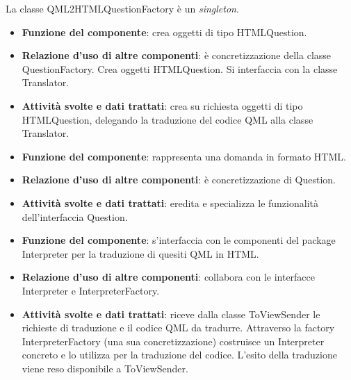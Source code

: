 \documentclass[a4paper,11pt]{article}
\begin{document}
			La classe QML2HTMLQuestionFactory è un \emph{singleton}.
			\begin{itemize}
				\item\textbf{Funzione del componente}: crea oggetti di tipo HTMLQuestion.
				\item\textbf{Relazione d'uso di altre componenti}: è concretizzazione della classe QuestionFactory. Crea oggetti HTMLQuestion. Si interfaccia con la classe Translator.
				\item\textbf{Attività svolte e dati trattati}: crea su richiesta oggetti di tipo HTMLQuestion, delegando la traduzione del codice QML alla classe Translator.
			\end{itemize}
			
			\begin{itemize}
				\item\textbf{Funzione del componente}: rappresenta una domanda in formato HTML.
				\item\textbf{Relazione d'uso di altre componenti}: è concretizzazione di Question.
				\item\textbf{Attività svolte e dati trattati}: eredita e specializza le funzionalità dell'interfaccia Question.
			\end{itemize}
			
			\begin{itemize}
				\item\textbf{Funzione del componente}: s'interfaccia con le componenti del package Interpreter per la traduzione di quesiti QML in HTML.
				\item\textbf{Relazione d'uso di altre componenti}: collabora con le interfacce Interpreter e InterpreterFactory.
				\item\textbf{Attività svolte e dati trattati}: riceve dalla classe ToViewSender le richieste di traduzione e il codice QML da tradurre. Attraverso la factory InterpreterFactory (una sua concretizzazione) costruisce un Interpreter concreto e lo utilizza per la traduzione del codice. L'esito della traduzione viene reso disponibile a ToViewSender.
			\end{itemize}
			\newpage
			
\end{document}

